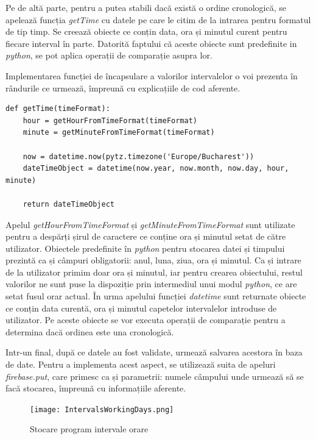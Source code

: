 	Pe de altă parte, pentru a putea stabili dacă există o ordine cronologică, se apelează funcția \textit{getTime} cu datele pe care le citim de la intrarea pentru formatul de tip timp. Se creează obiecte ce conțin data, ora și minutul curent pentru fiecare interval în parte. Datorită faptului că aceste obiecte sunt predefinite in \textit{python}, se pot aplica operații de comparație asupra lor. 

	Implementarea funcției de încapsulare a valorilor intervalelor o voi prezenta în rândurile ce urmează, împreună cu explicațiile de cod aferente. 

\vspace{1em}
\begin{lstlisting}
def getTime(timeFormat):
    hour = getHourFromTimeFormat(timeFormat)
    minute = getMinuteFromTimeFormat(timeFormat)

    now = datetime.now(pytz.timezone('Europe/Bucharest'))
    dateTimeObject = datetime(now.year, now.month, now.day, hour, minute)

    return dateTimeObject
\end{lstlisting}
\vspace{2em} 

	Apelul \textit{getHourFromTimeFormat} și \textit{getMinuteFromTimeFormat} sunt utilizate pentru a despărți șirul de caractere ce conține ora și minutul setat de către utilizator. Obiectele predefinite în \textit{python} pentru stocarea datei și timpului prezintă ca și câmpuri obligatorii: anul, luna, ziua, ora și minutul. Ca și intrare de la utilizator primim doar ora și minutul, iar pentru crearea obiectului, restul valorilor ne sunt puse la dispoziție prin intermediul unui modul \textit{python}, ce are setat fusul orar actual. În urma apelului funcției \textit{datetime} sunt returnate obiecte ce conțin data curentă, ora și minutul capetelor intervalelor introduse de utilizator. Pe aceste obiecte se vor executa operații de comparație pentru a determina dacă ordinea este una cronologică.

	Intr-un final, după ce datele au fost validate, urmează salvarea acestora în baza de date. Pentru a implementa acest aspect, se utilizează suita de apeluri \textit{firebase.put}, care primesc ca și parametrii: numele câmpului unde urmează să se facă stocarea, împreună cu informațiile aferente.


\begin{figure}[H]
   	\centering
    	\texttt{[image: IntervalsWorkingDays.png]}
	\caption{Stocare program intervale orare}
\end{figure}

